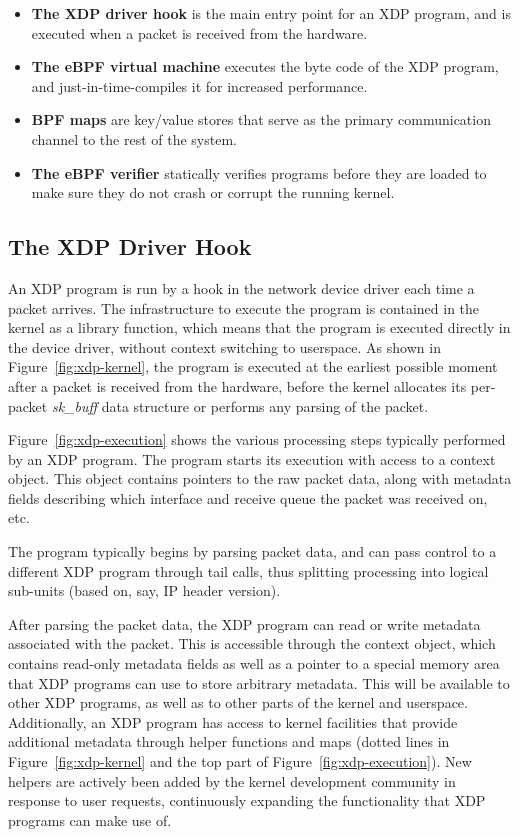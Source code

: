 \documentclass[sigconf]{acmart}
\begin{document}
\begin{itemize}
\item \textbf{The XDP driver hook} is the main entry point for an XDP program,
  and is executed when a packet is received from the hardware.

\item \textbf{The eBPF virtual machine} executes the byte code of the XDP
  program, and just-in-time-compiles it for increased performance.

\item \textbf{BPF maps} are key/value stores that serve as the primary
  communication channel to the rest of the system.

\item \textbf{The eBPF verifier} statically verifies programs before they are
  loaded to make sure they do not crash or corrupt the running kernel.
\end{itemize}


\subsection{The XDP Driver Hook}
\label{sec:prog-model}


An XDP program is run by a hook in the network device driver each time a packet
arrives. The infrastructure to execute the program is contained in the kernel as
a library function, which means that the program is executed directly in the
device driver, without context switching to userspace. As shown in
Figure~\ref{fig:xdp-kernel}, the program is executed at the earliest possible
moment after a packet is received from the hardware, before the kernel allocates
its per-packet \emph{sk\_buff} data structure or performs any parsing of the
packet.

Figure~\ref{fig:xdp-execution} shows the various processing steps typically
performed by an XDP program. The program starts its execution with access to a
context object. This object contains pointers to the raw packet data, along with
metadata fields describing which interface and receive queue the packet was
received on, etc.

The program typically begins by parsing packet data, and can pass control to a
different XDP program through tail calls, thus splitting processing into
logical sub-units (based on, say, IP header version).

After parsing the packet data, the XDP program can read or write metadata
associated with the packet. This is accessible through the context object, which
contains read-only metadata fields as well as a pointer to a special memory area
that XDP programs can use to store arbitrary metadata. This will be available to
other XDP programs, as well as to other parts of the kernel and userspace.
Additionally, an XDP program has access to kernel facilities that provide
additional metadata through helper functions and maps (dotted lines in
Figure~\ref{fig:xdp-kernel} and the top part of Figure~\ref{fig:xdp-execution}).
New helpers are actively been added by the kernel development community in
response to user requests, continuously expanding the functionality that XDP
programs can make use of.
\end{document}
